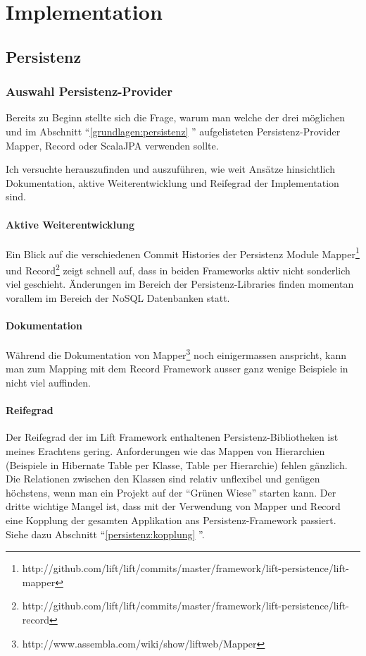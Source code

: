 \chapter{Implementation}\label{implementation}

\section{Persistenz}
\subsection{Auswahl Persistenz-Provider}
Bereits zu Beginn stellte sich die Frage, warum man welche der drei m\"oglichen und im Abschnitt ``\ref{grundlagen:persistenz} '' aufgelisteten Persistenz-Provider Mapper, Record oder ScalaJPA  verwenden sollte.

Ich versuchte herauszufinden und auszuf\"uhren, wie weit Ans\"atze hinsichtlich Dokumentation, aktive Weiterentwicklung und Reifegrad der Implementation sind.

\subsubsection{Aktive Weiterentwicklung}
Ein Blick auf die verschiedenen Commit Histories der Persistenz Module Mapper\footnote{http://github.com/lift/lift/commits/master/framework/lift-persistence/lift-mapper} und Record\footnote{http://github.com/lift/lift/commits/master/framework/lift-persistence/lift-record} zeigt schnell auf, dass in beiden Frameworks aktiv nicht sonderlich viel geschieht. \"Anderungen im Bereich der Persistenz-Libraries finden momentan vorallem im Bereich der NoSQL Datenbanken statt. 

\subsubsection{Dokumentation}
W\"ahrend die Dokumentation von Mapper\footnote{http://www.assembla.com/wiki/show/liftweb/Mapper} noch einigermassen anspricht, kann man zum Mapping mit dem Record Framework ausser ganz wenige Beispiele in \cite[p. 79 - 113]{chen2009lift} nicht viel auffinden.

\subsubsection{Reifegrad}
Der Reifegrad der im Lift Framework enthaltenen Persistenz-Bibliotheken ist meines Erachtens gering. Anforderungen wie das Mappen von Hierarchien (Beispiele in Hibernate Table per Klasse, Table per Hierarchie) fehlen g\"anzlich. Die Relationen zwischen den Klassen sind relativ unflexibel und gen\"ugen h\"ochstens, wenn man ein Projekt auf der ``Gr\"unen Wiese'' starten kann. Der dritte wichtige Mangel ist, dass mit der Verwendung von Mapper und Record eine Kopplung der gesamten Applikation ans Persistenz-Framework passiert. Siehe dazu Abschnitt ``\ref{persistenz:kopplung} ''.


